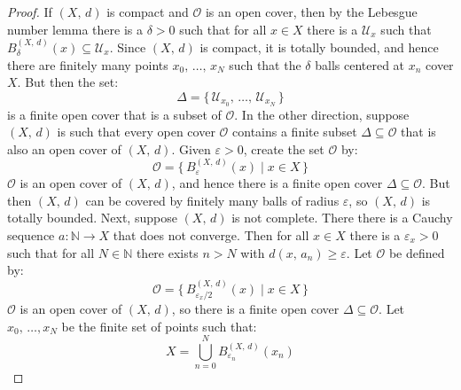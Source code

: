 \documentclass{article}
\theoremstyle{plain}
\theoremstyle{normal}
\begin{document}
        \begin{proof}
            If $(X,\,d)$ is compact and $\mathcal{O}$ is an open cover, then
            by the Lebesgue number lemma there is a $\delta>0$ such that for
            all $x\in{X}$ there is a $\mathcal{U}_{x}$ such that
            $B_{\delta}^{(X,\,d)}(x)\subseteq\mathcal{U}_{x}$. Since
            $(X,\,d)$ is compact, it is totally bounded, and hence there are
            finitely many points $x_{0},\,\dots,\,x_{N}$ such that the
            $\delta$ balls centered at $x_{n}$ cover $X$. But then the set:
            \begin{equation}
                \Delta=\{\,\mathcal{U}_{x_{0}},\,\dots,\,\mathcal{U}_{x_{N}}\,\}
            \end{equation}
            is a finite open cover that is a subset of $\mathcal{O}$. In the
            other direction, suppose $(X,\,d)$ is such that every open cover
            $\mathcal{O}$ contains a finite subset $\Delta\subseteq\mathcal{O}$
            that is also an open cover of $(X,\,d)$. Given $\varepsilon>0$,
            create the set $\mathcal{O}$ by:
            \begin{equation}
                \mathcal{O}=\{\,B_{\varepsilon}^{(X,\,d)}(x)\;|\;x\in{X}\,\}
            \end{equation}
            $\mathcal{O}$ is an open cover of $(X,\,d)$, and hence there is a
            finite open cover $\Delta\subseteq\mathcal{O}$. But then $(X,\,d)$
            can be covered by finitely many balls of radius $\varepsilon$, so
            $(X,\,d)$ is totally bounded. Next, suppose $(X,\,d)$ is not
            complete. There there is a Cauchy sequence
            $a:\mathbb{N}\rightarrow{X}$ that does not converge. Then for all
            $x\in{X}$ there is a $\varepsilon_{x}>0$ such that for all
            $N\in\mathbb{N}$ there exists $n>N$ with
            $d(x,\,a_{n})\geq\varepsilon$. Let $\mathcal{O}$ be defined by:
            \begin{equation}
                \mathcal{O}=\{\,B_{\varepsilon_{x}/2}^{(X,\,d)}(x)\;|\;x\in{X}\,\}
            \end{equation}
            $\mathcal{O}$ is an open cover of $(X,\,d)$, so there is a finite
            open cover $\Delta\subseteq\mathcal{O}$. Let
            $x_{0},\,\dots,x_{N}$ be the finite set of points such that:
            \begin{equation}
                X=\bigcup_{n=0}^{N}B_{\varepsilon_{n}}^{(X,\,d)}(x_{n})
            \end{equation}

\end{proof}
\end{document}
